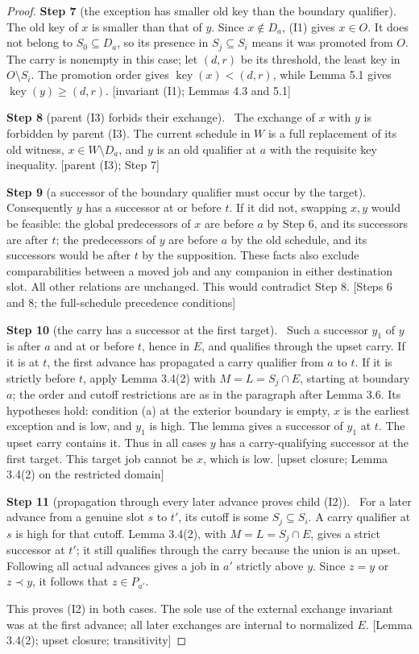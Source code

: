 \documentclass[11pt,a4paper]{article}
\theoremstyle{plain}
\theoremstyle{definition}
\newcommand{\step}[2]{\par\smallskip\noindent\textbf{Step #1} (#2).\ \ignorespaces}
\newcommand{\by}[1]{{\small[#1]}}
\begin{document}
\begin{proof}
\step{7}{the exception has smaller old key than the boundary qualifier}
The old key of \(x\) is smaller than that of \(y\). Since \(x\notin D_a\), (I1) gives \(x\in O\). It does not belong to \(S_0\subseteq D_a\), so its presence in \(S_j\subseteq S_i\) means it was promoted from \(O\). The carry is nonempty in this case; let \((d,r)\) be its threshold, the least key in \(O\setminus S_i\). The promotion order gives \(\operatorname{key}(x)<(d,r)\), while Lemma 5.1 gives \(\operatorname{key}(y)\geq(d,r)\).
\by{invariant (I1); Lemmas 4.3 and 5.1}

\step{8}{parent (I3) forbids their exchange}
The exchange of \(x\) with \(y\) is forbidden by parent (I3). The current schedule in \(W\) is a full replacement of its old witness, \(x\in W\setminus D_a\), and \(y\) is an old qualifier at \(a\) with the requisite key inequality.
\by{parent (I3); Step 7}

\step{9}{a successor of the boundary qualifier must occur by the target}
Consequently \(y\) has a successor at or before \(t\). If it did not, swapping \(x,y\) would be feasible: the global predecessors of \(x\) are before \(a\) by Step 6, and its successors are after \(t\); the predecessors of \(y\) are before \(a\) by the old schedule, and its successors would be after \(t\) by the supposition. These facts also exclude comparabilities between a moved job and any companion in either destination slot. All other relations are unchanged. This would contradict Step 8.
\by{Steps 6 and 8; the full-schedule precedence conditions}

\step{10}{the carry has a successor at the first target}
Such a successor \(y_1\) of \(y\) is after \(a\) and at or before \(t\), hence in \(E\), and qualifies through the upset carry. If it is at \(t\), the first advance has propagated a carry qualifier from \(a\) to \(t\). If it is strictly before \(t\), apply Lemma 3.4(2) with \(M=L=S_j\cap E\), starting at boundary \(a\); the order and cutoff restrictions are as in the paragraph after Lemma 3.6. Its hypotheses hold: condition (a) at the exterior boundary is empty, \(x\) is the earliest exception and is low, and \(y_1\) is high. The lemma gives a successor of \(y_1\) at \(t\). The upset carry contains it. Thus in all cases \(y\) has a carry-qualifying successor at the first target. This target job cannot be \(x\), which is low.
\by{upset closure; Lemma 3.4(2) on the restricted domain}

\step{11}{propagation through every later advance proves child (I2)}
For a later advance from a genuine slot \(s\) to \(t'\), its cutoff is some \(S_j\subseteq S_i\). A carry qualifier at \(s\) is high for that cutoff. Lemma 3.4(2), with \(M=L=S_j\cap E\), gives a strict successor at \(t'\); it still qualifies through the carry because the union is an upset. Following all actual advances gives a job in \(a'\) strictly above \(y\). Since \(z=y\) or \(z\prec y\), it follows that \(z\in P_{a'}\).

This proves (I2) in both cases. The sole use of the external exchange invariant was at the first advance; all later exchanges are internal to normalized \(E\).
\by{Lemma 3.4(2); upset closure; transitivity}
\end{proof}
\end{document}
